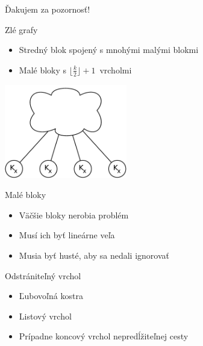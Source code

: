 \documentclass[slovak]{beamer}
\begin{document}
\begin{frame}[plain,c]

\begin{center}
\Huge Ďakujem za pozornosť!
\end{center}

\end{frame}

\appendix

\begin{frame}{Zlé grafy}
    \begin{itemize}
        \item Stredný blok spojený s mnohými malými blokmi
        \item Malé bloky s $\lfloor \frac{k}{2} \rfloor + 1$ vrcholmi
    \end{itemize}
    \begin{center}
        \includegraphics[width=0.4\textwidth]{grafy/zlygraf.pdf}
    \end{center}
\end{frame}

\begin{frame}{Malé bloky}
    \begin{itemize}
        \item Väčšie bloky nerobia problém
        \item Musí ich byť lineárne veľa
        \item Musia byť husté, aby sa nedali ignorovať
    \end{itemize}
\end{frame}

\begin{frame}{Odstrániteľný vrchol}
    \begin{itemize}
        \item Ľubovoľná kostra
        \item Listový vrchol
        \item Prípadne koncový vrchol nepredĺžiteľnej cesty
    \end{itemize}
\end{frame}
\end{document}
